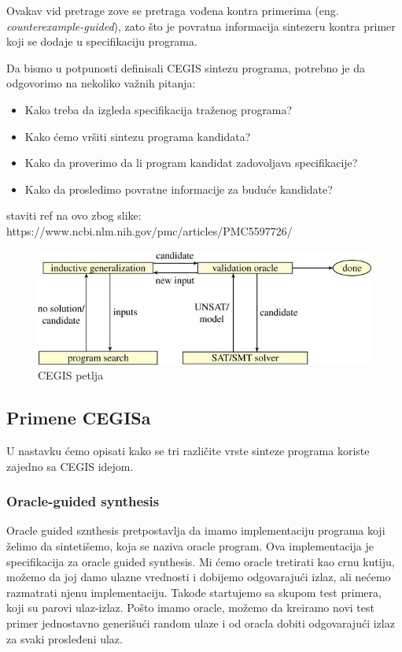 Ovakav vid pretrage zove se pretraga vođena kontra primerima (eng. \emph{counterexample-guided}), zato što je povratna informacija sintezeru kontra primer koji se dodaje u specifikaciju programa. 

Da bismo u potpunosti definisali CEGIS sintezu programa, potrebno je da odgovorimo na nekoliko važnih pitanja:

\begin{itemize}
  \item Kako treba da izgleda specifikacija traženog programa?
  \item Kako ćemo vršiti sintezu programa kandidata?
  \item Kako da proverimo da li program kandidat zadovoljava specifikacije?
  \item Kako da prosledimo povratne informacije za buduće kandidate?
\end{itemize}

staviti ref na ovo zbog slike: https://www.ncbi.nlm.nih.gov/pmc/articles/PMC5597726/


\begin{figure}[h!]
\begin{center}
\includegraphics[scale=0.4]{resources/cegis.jpeg}
\end{center}
\caption{CEGIS petlja}
\label{fig:cegis}
\end{figure}


\subsection{Primene CEGISa}
\label{subsec:primeneCEGISa}

U nastavku ćemo opisati kako se tri različite vrste sinteze programa koriste zajedno sa CEGIS idejom.

\subsubsection{Oracle-guided synthesis}
\label{subsec:oracleGuidedSynthesis}

Oracle guided sznthesis pretpostavlja da imamo implementaciju programa koji želimo da sintetišemo, koja se naziva oracle program. Ova implementacija je specifikacija za oracle guided synthesis. Mi ćemo oracle tretirati kao crnu kutiju, možemo da joj damo ulazne vrednosti i dobijemo odgovarajući izlaz, ali nećemo razmatrati njenu implementaciju. Takođe startujemo sa skupom test primera, koji su parovi ulaz-izlaz. Pošto imamo oracle, možemo da kreiramo novi test primer jednostavno generišući random ulaze i od oracla dobiti odgovarajući izlaz za svaki prosleđeni ulaz.

